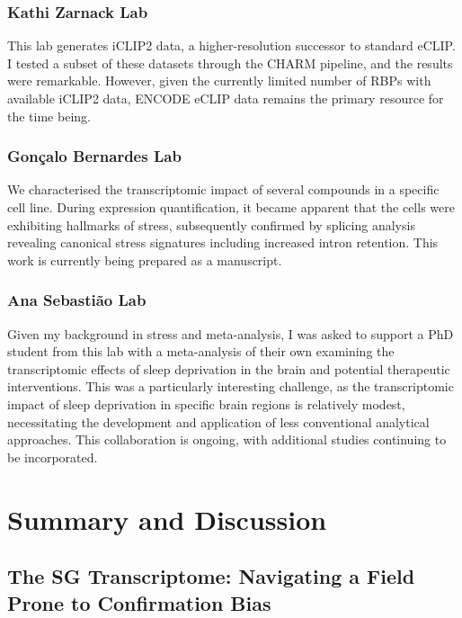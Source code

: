 \subsubsection{Kathi Zarnack Lab}
This lab generates iCLIP2 data, a higher-resolution successor to standard eCLIP. I tested a subset of these datasets through the CHARM pipeline, and the results were remarkable. However, given the currently limited number of RBPs with available iCLIP2 data, ENCODE eCLIP data remains the primary resource for the time being.
\subsubsection{Gonçalo Bernardes Lab}
We characterised the transcriptomic impact of several compounds in a specific cell line. During expression quantification, it became apparent that the cells were exhibiting hallmarks of stress, subsequently confirmed by splicing analysis revealing canonical stress signatures including increased intron retention. This work is currently being prepared as a manuscript.
\subsubsection{Ana Sebastião Lab}
Given my background in stress and meta-analysis, I was asked to support a PhD student from this lab with a meta-analysis of their own examining the transcriptomic effects of sleep deprivation in the brain and potential therapeutic interventions. This was a particularly interesting challenge, as the transcriptomic impact of sleep deprivation in specific brain regions is relatively modest, necessitating the development and application of less conventional analytical approaches. This collaboration is ongoing, with additional studies continuing to be incorporated.

\section{Summary and Discussion}
\subsection{The SG Transcriptome: Navigating a Field Prone to Confirmation Bias}

